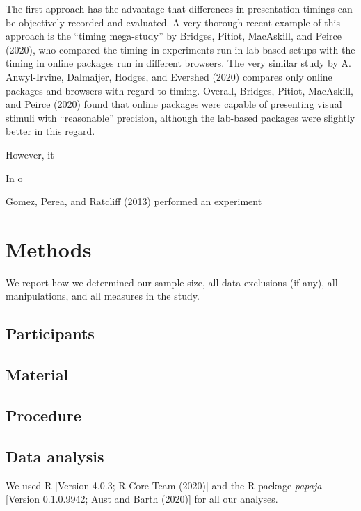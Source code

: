 \documentclass[
  english,
  man]{apa6}
\begin{document}
The first approach has the advantage that differences in presentation timings can be objectively recorded and evaluated. A very thorough recent example of this approach is the ``timing mega-study'' by Bridges, Pitiot, MacAskill, and Peirce (2020), who compared the timing in experiments run in lab-based setups with the timing in online packages run in different browsers. The very similar study by A. Anwyl-Irvine, Dalmaijer, Hodges, and Evershed (2020) compares only online packages and browsers with regard to timing. Overall, Bridges, Pitiot, MacAskill, and Peirce (2020) found that online packages were capable of presenting visual stimuli with ``reasonable'' precision, although the lab-based packages were slightly better in this regard.

However, it

In o

Gomez, Perea, and Ratcliff (2013) performed an experiment

\hypertarget{methods}{%
\section{Methods}\label{methods}}

We report how we determined our sample size, all data exclusions (if any), all manipulations, and all measures in the study.

\hypertarget{participants}{%
\subsection{Participants}\label{participants}}

\hypertarget{material}{%
\subsection{Material}\label{material}}

\hypertarget{procedure}{%
\subsection{Procedure}\label{procedure}}

\hypertarget{data-analysis}{%
\subsection{Data analysis}\label{data-analysis}}

We used R {[}Version 4.0.3; R Core Team (2020){]} and the R-package \emph{papaja} {[}Version 0.1.0.9942; Aust and Barth (2020){]} for all our analyses.
\end{document}
